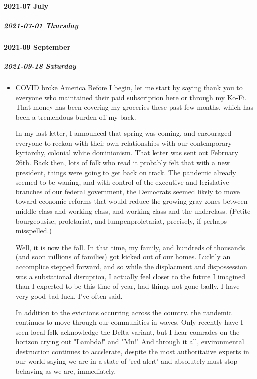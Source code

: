 \documentclass[11pt]{article}
\begin{document}
\paragraph*{2021-07 July}
\label{sec:orga53f6ae}
\subparagraph*{2021-07-01 Thursday}
\label{sec:org0882488}
\paragraph*{2021-09 September}
\label{sec:orgc395ef3}
\startcontents[level-4]
\subparagraph*{2021-09-18 Saturday}
\label{sec:org5994c1d}
\begin{itemize}
\item COVID broke America
\label{sec:org5842acd}
Before I begin, let me start by saying thank you to everyone who maintained their paid subscription here or through my Ko-Fi. That money has been covering my groceries these past few months, which has been a tremendous burden off my back.

In my last letter, I announced that spring was coming, and encouraged everyone to reckon with their own relationships with our contemporary kyriarchy, colonial white dominionism. That letter was sent out February 26th. Back then, lots of folk who read it probably felt that with a new president, things were going to get back on track. The pandemic already seemed to be waning, and with control of the executive and legislative branches of our federal government, the Democrats seemed likely to move toward economic reforms that would reduce the growing gray-zones between middle class and working class, and working class and the underclass. (Petite bourgeousise, proletariat, and lumpenproletariat, precisely, if perhaps misspelled.)

Well, it is now the fall. In that time, my family, and hundreds of thousands (and soon millions of families) got kicked out of our homes. Luckily an accomplice stepped forward, and so while the displacment and dispossession was a substational disruption, I actually feel closer to the future I imagined than I expected to be this time of year, had things not gone badly. I have very good bad luck, I've often said.

In addition to the evictions occurring across the country, the pandemic continues to move through our communities in waves. Only recently have I seen local folk acknowledge the Delta variant, but I hear comrades on the horizon crying out "Lambda!" and "Mu!" And through it all, environmental destruction continues to accelerate, despite the most authoritative experts in our world saying we are in a state of 'red alert' and absolutely must stop behaving as we are, immediately.


\end{itemize}
\end{document}

